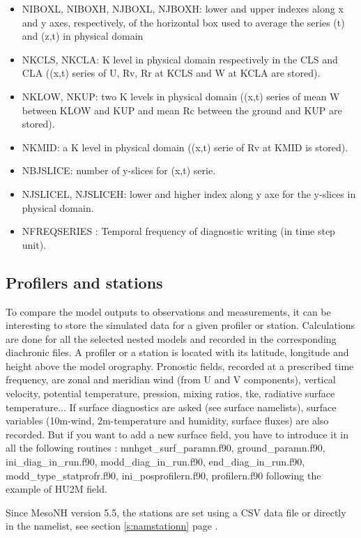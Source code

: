 \begin{itemize}
\item
NIBOXL, NIBOXH, NJBOXL, NJBOXH: lower and upper indexes along x and y axes, respectively, 
 of the horizontal box used to average the series (t) and (z,t) in physical domain
\item
NKCLS, NKCLA: K level in physical domain respectively in the CLS and CLA ((x,t) series of
 U, Rv, Rr at KCLS and W at KCLA are stored).
\item NKLOW, NKUP: two K levels in physical domain ((x,t) series of mean W between KLOW and KUP
 and mean Rc between the ground and KUP are stored).
\item NKMID: a K level in physical domain ((x,t) serie of Rv at KMID is stored).
\item NBJSLICE: number of y-slices for (x,t) serie.
\item NJSLICEL, NJSLICEH: lower and higher index along y axe for the y-slices in physical domain.
\item NFREQSERIES : Temporal frequency of diagnostic writing (in time step unit).                    
\end{itemize}

\subsection{Profilers and stations} 
\label{ss:station}
To compare the model outputs to observations
and measurements, it can be interesting to store the simulated data for a given
profiler or station. Calculations are done for all the selected nested models and recorded in the corresponding diachronic files.
A profiler or a station is located with its latitude,
longitude and height above the model orography.
Pronostic fields, recorded at a prescribed time frequency, are
zonal and meridian wind
(from U and V components), vertical velocity, potential temperature, pression,
mixing ratios, tke, radiative surface temperature...
If surface diagnostics are asked (see surface namelists), surface variables
(10m-wind, 2m-temperature and humidity, surface fluxes) are also recorded. But if you want to add a new surface field, you have to introduce it in all the following routines : mnhget\_surf\_paramn.f90, ground\_paramn.f90, ini\_diag\_in\_run.f90, modd\_diag\_in\_run.f90, end\_diag\_in\_run.f90, modd\_type\_statprofr.f90, ini\_posprofilern.f90, profilern.f90 following the example of HU2M field.

Since MesoNH version 5.5, the stations are set using a CSV data file or directly in the namelist, see section \ref{s:namstationn} page \pageref{s:namstationn}.

